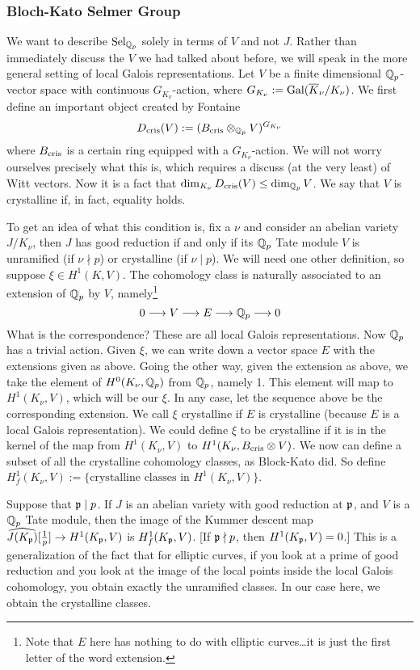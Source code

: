 \subsubsection{Bloch-Kato Selmer Group}

We want to describe $\operatorname{Sel}_{\mathbb{Q}_p}$ solely in terms of $V$ and not $J$. Rather than immediately discuss the $V$ we had talked about before, we will speak in the more general setting of local Galois representations. Let $V$ be a finite dimensional $\mathbb{Q}_p$-vector space with continuous $G_{K_\nu}$-action, where $G_{K_\nu}:= \operatorname{Gal}(\overline{K}_\nu/K_\nu)$. We first define an important object created by Fontaine
	\[
	D_{\text{cris}}(V):= (B_{\text{cris}} \otimes_{\mathbb{Q}_p} V)^{G_{K_\nu}}
	\]
where $B_{\text{cris}}$ is a certain ring equipped with a $G_{K_\nu}$-action. We will not worry ourselves precisely what this is, which requires a discuss (at the very least) of Witt vectors. Now it is a fact that $\dim_{K_\nu} D_{\text{cris}}(V) \leq \dim_{\mathbb{Q}_p} V$. We say that $V$ is crystalline if, in fact, equality holds. 


To get an idea of what this condition is, fix a $\nu$ and consider an abelian variety $J/K_\nu$, then $J$ has good reduction if and only if its $\mathbb{Q}_p$ Tate module $V$ is unramified (if $\nu \nmid p$) or crystalline (if $\nu \mid p$). We will need one other definition, so suppose $\xi \in H^1(K,V)$. The cohomology class is naturally associated to an extension of $\mathbb{Q}_p$ by $V$, namely\footnote{Note that $E$ here has nothing to do with elliptic curves\dots it is just the first letter of the word extension.}
	\[
	0 \stackrel{}{\longrightarrow} V \stackrel{}{\longrightarrow} E \stackrel{}{\longrightarrow} \mathbb{Q}_p \stackrel{}{\longrightarrow} 0
	\]
What is the correspondence? These are all local Galois representations. Now $\mathbb{Q}_p$ has a trivial action. Given $\xi$, we can write down a vector space $E$ with the extensions given as above. Going the other way, given the extension as above, we take the element of $H^0(K_\nu,\mathbb{Q}_p)$ from $\mathbb{Q}_p$, namely 1. This element will map to $H^1(K_\nu,V)$, which will be our $\xi$. In any case, let the sequence above be the corresponding extension. We call $\xi$ crystalline if $E$ is crystalline (because $E$ is a local Galois representation). We could define $\xi$ to be crystalline if it is in the kernel of the map from $H^1(K_\nu,V)$ to $H^1(K_\nu, B_{\text{cris}} \otimes V)$. We now can define a subset of all the crystalline cohomology classes, as Block-Kato did. So define $H_f^1(K_\nu,V):= \{ \text{crystalline classes in } H^1(K_\nu,V) \}$. 


\begin{rem}
Suppose that $\mathfrak{p} \mid p$. If $J$ is an abelian variety with good reduction at $\mathfrak{p}$, and $V$ is a $\mathbb{Q}_p$ Tate module, then the image of the Kummer descent map $\widehat{J(K_{\mathfrak{p}})}[\frac{1}{p}] \to H^1(K_{\mathfrak{p}},V)$ is $H_f^1(K_{\mathfrak{p}},V)$. [If $\mathfrak{p} \nmid p$, then $H^1(K_{\mathfrak{p}},V)= 0$.] This is a generalization of the fact that for elliptic curves, if you look at a prime of good reduction and you look at the image of the local  points inside the local Galois cohomology, you obtain exactly the unramified classes. In our case here, we obtain the crystalline classes. 
\end{rem}



